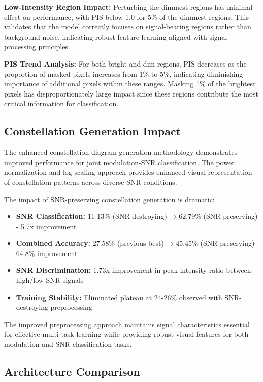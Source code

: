 \documentclass{ELSP}
\begin{document}
{{\textbf{Low-Intensity Region Impact:} Perturbing the dimmest regions has minimal effect on performance, with PIS below 1.0 for 5\% of the dimmest regions. This validates that the model correctly focuses on signal-bearing regions rather than background noise, indicating robust feature learning aligned with signal processing principles.

\textbf{PIS Trend Analysis:} For both bright and dim regions, PIS decreases as the proportion of masked pixels increases from 1\% to 5\%, indicating diminishing importance of additional pixels within these ranges. Masking 1\% of the brightest pixels has disproportionately large impact since these regions contribute the most critical information for classification.

\subsection{Constellation Generation Impact}

The enhanced constellation diagram generation methodology demonstrates improved performance for joint modulation-SNR classification. The power normalization and log scaling approach provides enhanced visual representation of constellation patterns across diverse SNR conditions.

The impact of SNR-preserving constellation generation is dramatic:

\begin{itemize}
    \item \textbf{SNR Classification:} 11-13\% (SNR-destroying) → 62.79\% (SNR-preserving) - 5.7x improvement
    \item \textbf{Combined Accuracy:} 27.58\% (previous best) → 45.45\% (SNR-preserving) - 64.8\% improvement
    \item \textbf{SNR Discrimination:} 1.73x improvement in peak intensity ratio between high/low SNR signals
    \item \textbf{Training Stability:} Eliminated plateau at 24-26\% observed with SNR-destroying preprocessing
\end{itemize}

The improved preprocessing approach maintains signal characteristics essential for effective multi-task learning while providing robust visual features for both modulation and SNR classification tasks.

\subsection{Architecture Comparison}

}}
\end{document}
